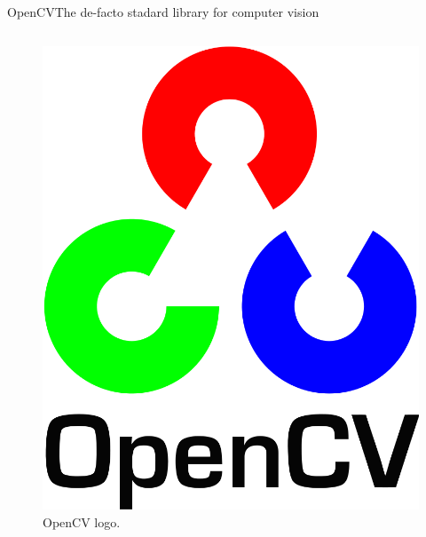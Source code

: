 \begin{frame}{OpenCV}{The de-facto stadard library for computer vision}
\begin{columns}
		\begin{figure}
			\centering
			\includegraphics[width=.6\textwidth]{opencv}
			\caption{OpenCV logo.}
			\label{fig:opencv}
		\end{figure}
	\end{columns}
\end{frame}

